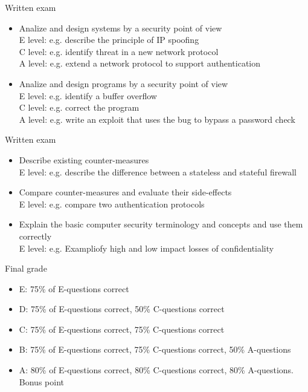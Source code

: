 \documentclass{beamer}
\begin{document}
\begin{frame}{Written exam}
  \begin{itemize}
\item Analize and design systems by a security point of view\\
E level: e.g. describe the principle of IP spoofing\\
C level: e.g. identify threat in a new network protocol\\
A level: e.g. extend a network protocol to support authentication
\item Analize and design programs by a security point of view\\
E level: e.g. identify a buffer overflow\\
C level: e.g. correct the program\\
A level: e.g. write an exploit that uses the bug to bypass a password check
\end{itemize}
\end{frame}

\begin{frame}{Written exam}
  \begin{itemize}
\item Describe existing counter-measures\\
E level: e.g. describe the difference between a stateless and stateful firewall
\item Compare counter-measures and evaluate their side-effects\\
E level: e.g. compare two authentication protocols
\item Explain the basic computer security terminology and concepts and use them correctly\\
E level: e.g. Exampliofy high and low impact losses of confidentiality
  \end{itemize}
  \end{frame}


\begin{frame}{Final grade}
  \begin{itemize}
  \item E: 75\% of E-questions correct
  \item D: 75\% of E-questions correct, 50\% C-questions correct
  \item C: 75\% of E-questions correct, 75\% C-questions correct
  \item B: 75\% of E-questions correct, 75\% C-questions correct, 50\%
    A-questions
  \item A: 80\% of E-questions correct, 80\% C-questions correct, 80\%
    A-questions. Bonus point
  \end{itemize}
\end{frame}
\end{document}
